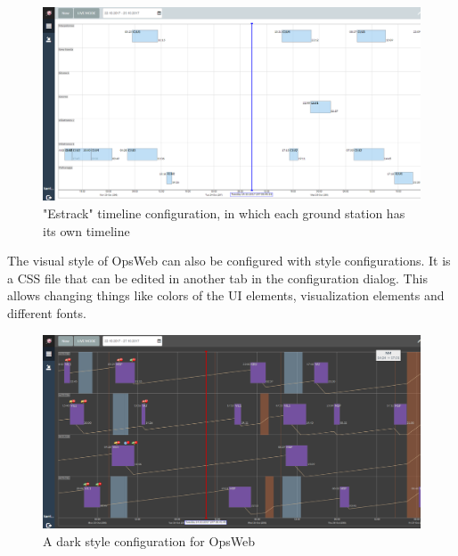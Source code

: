 \begin{figure}[ht]
  \begin{center}
    \includegraphics*[width=1\textwidth]{new_cw_estrack}
  \end{center}
  \caption{"Estrack" timeline configuration, in which each ground station has its own timeline}
  \label{fig:new_cw_estrack}
\end{figure}

The visual style of OpsWeb can also be configured with style configurations. It is a CSS file that can be edited in another tab in the configuration dialog. This allows changing things like colors of the UI elements, visualization elements and different fonts.

\begin{figure}[ht]
  \begin{center}
    \includegraphics*[width=1\textwidth]{new_cw_dark}
  \end{center}
  \caption{A dark style configuration for OpsWeb}
  \label{fig:new_cw_dark}
\end{figure}

